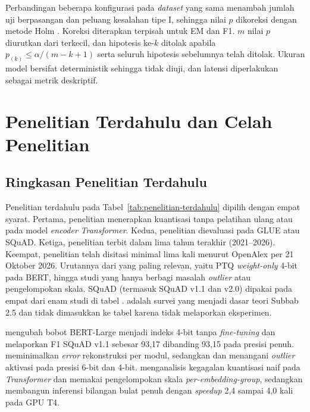Perbandingan beberapa konfigurasi pada \textit{dataset} yang sama menambah jumlah uji berpasangan dan peluang kesalahan tipe I, sehingga nilai $p$ dikoreksi dengan metode Holm \parencite{holm1979}. Koreksi diterapkan terpisah untuk EM dan F1. $m$ nilai $p$ diurutkan dari terkecil, dan hipotesis ke-$k$ ditolak apabila $p_{(k)} \le \alpha/(m-k+1)$ serta seluruh hipotesis sebelumnya telah ditolak. Ukuran model bersifat deterministik sehingga tidak diuji, dan latensi diperlakukan sebagai metrik deskriptif.

\section{Penelitian Terdahulu dan Celah Penelitian}

\subsection{Ringkasan Penelitian Terdahulu}

Penelitian terdahulu pada Tabel~\ref{tab:penelitian-terdahulu} dipilih dengan empat syarat. Pertama, penelitian menerapkan kuantisasi tanpa pelatihan ulang atau pada model \textit{encoder} \textit{Transformer}. Kedua, penelitian dievaluasi pada GLUE atau SQuAD. Ketiga, penelitian terbit dalam lima tahun terakhir (2021--2026). Keempat, penelitian telah disitasi minimal lima kali menurut OpenAlex per 21 Oktober 2026. Urutannya dari yang paling relevan, yaitu PTQ \textit{weight-only} 4-bit pada BERT, hingga studi yang hanya berbagi masalah \textit{outlier} atau pengelompokan skala. SQuAD (termasuk SQuAD v1.1 dan v2.0) dipakai pada empat dari enam studi di tabel \parencite{zadeh2022mokey, bai2022towards, guo2023olive, wei2022outlier}. \textcite{gholami2021survey} adalah survei yang menjadi dasar teori Subbab 2.5 dan tidak dimasukkan ke tabel karena tidak melaporkan eksperimen.

\textcite{zadeh2022mokey} mengubah bobot BERT-Large menjadi indeks 4-bit tanpa \textit{fine-tuning} dan melaporkan F1 SQuAD v1.1 sebesar 93,17 dibanding 93,15 pada presisi penuh. \textcite{bai2022towards} meminimalkan \textit{error} rekonstruksi per modul, sedangkan \textcite{wei2022outlier} dan \textcite{guo2023olive} menangani \textit{outlier} aktivasi pada presisi 6-bit dan 4-bit. \textcite{bondarenko2021understanding} menganalisis kegagalan kuantisasi naif pada \textit{Transformer} dan memakai pengelompokan skala \textit{per-embedding-group}, sedangkan \textcite{kim2021ibert} membangun inferensi bilangan bulat penuh dengan \textit{speedup} 2,4 sampai 4,0 kali pada GPU T4.

